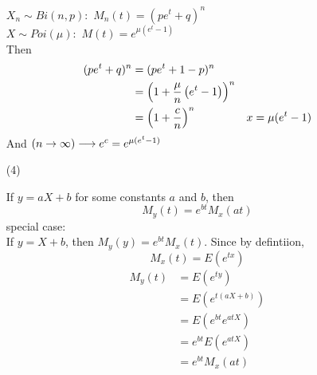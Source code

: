 \documentclass[english, 11pt]{article}
\begin{document}
\begin{itemize}
\begin{exmp}
      $X_n \sim Bi(n,p):$ $M_n(t) = (pe^t + q)^n$ \\
      $X \sim Poi(\mu):$ $M(t) = e^{\mu(e^t - 1)}$ \\
      Then
      \begin{align*}
        (pe^t + q)^n & = (pe^t + 1 - p)^n \\
        & = \left(1 + \frac{\mu}{n}\left( e^t - 1 \right)\right)^n \\
        & = \left( 1 + \frac{c}{n} \right)^n & x = \mu(e^t -1)
      \end{align*}
      And $(n \rightarrow \infty) \longrightarrow e^c = e^{\mu(e^t -1)}$
          \end{exmp}

          \item[(4)]

     If $y = aX + b$ for some constants $a$ and $b$, then
     \[ M_y(t) = e^{bt}M_x(at) \]
     special case: \\
     If $y = X + b$, then $M_y(y) = e^{bt}M_x(t)$. Since by defintiion,
     \[ M_x(t) = E(e^{tx}) \]
     \begin{align*}
       M_y(t) & = E(e^{ty}) \\
              & = E(e^{t(aX + b)}) \\
              & = E(e^{bt}e^{atX}) \\
              & = e^{bt}E(e^{atX}) \\
              & = e^{bt}M_x(at)
     \end{align*}

  \end{itemize}
\end{document}
